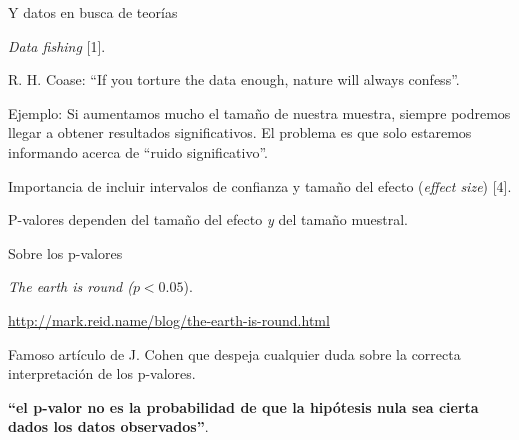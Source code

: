 \begin{frame}{Y datos en busca de teorías}
  \begin{wideitemize}
  \item \textit{Data fishing} [1].
  
  \item R. H. Coase: ``If you torture the data enough, nature will always
  confess''.
  
  \item Ejemplo: Si aumentamos mucho el tamaño de nuestra muestra, siempre podremos
  llegar a obtener resultados significativos. El problema es que solo estaremos
  informando acerca de ``ruido significativo''.
  
  \item Importancia de incluir intervalos de confianza y tamaño del efecto
  (\textit{effect size}) [4].
  
  \item P-valores dependen del tamaño del efecto \textit{y} del tamaño muestral.

 \end{wideitemize}

\end{frame}


\begin{frame}{Sobre los p-valores}
  \begin{wideitemize}
  
  \item \textit{The earth is round ($p < 0.05$}).
  \item \url{http://mark.reid.name/blog/the-earth-is-round.html}
  
  \item Famoso artículo de J. Cohen que despeja cualquier duda sobre la correcta
  interpretación de los p-valores.
  
  \item \textbf{``el p-valor no es la probabilidad de que la hipótesis nula sea
  cierta dados los datos observados''}.

 \end{wideitemize}

\end{frame}


